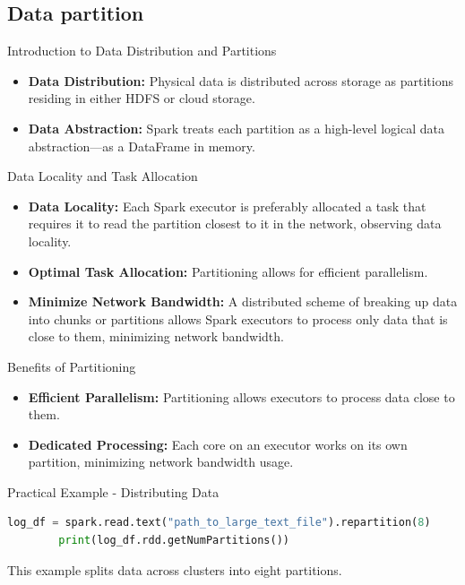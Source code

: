 
\subsection{Data partition}\label{subsec:data-partition}


\begin{frame}{Introduction to Data Distribution and Partitions}
    \begin{itemize}
        \item \textbf{Data Distribution:} Physical data is distributed across storage as partitions residing in either HDFS or cloud storage.
        \item \textbf{Data Abstraction:} Spark treats each partition as a high-level logical data abstraction—as a DataFrame in memory.
    \end{itemize}
\end{frame}

\begin{frame}{Data Locality and Task Allocation}
    \begin{itemize}
        \item \textbf{Data Locality:} Each Spark executor is preferably allocated a task that requires it to read the partition closest to it in the network, observing data locality.
        \item \textbf{Optimal Task Allocation:} Partitioning allows for efficient parallelism.
        \item \textbf{Minimize Network Bandwidth:} A distributed scheme of breaking up data into chunks or partitions allows Spark executors to process only data that is close to them, minimizing network bandwidth.
    \end{itemize}
\end{frame}

\begin{frame}{Benefits of Partitioning}
    \begin{itemize}
        \item \textbf{Efficient Parallelism:} Partitioning allows executors to process data close to them.
        \item \textbf{Dedicated Processing:} Each core on an executor works on its own partition, minimizing network bandwidth usage.
    \end{itemize}
\end{frame}

\begin{frame}[fragile]{Practical Example - Distributing Data}
    \begin{lstlisting}[language=Python,label={lst:pyspark-data-partitioning}]
        log_df = spark.read.text("path_to_large_text_file").repartition(8)
        print(log_df.rdd.getNumPartitions())
    \end{lstlisting}
    This example splits data across clusters into eight partitions.
\end{frame}

